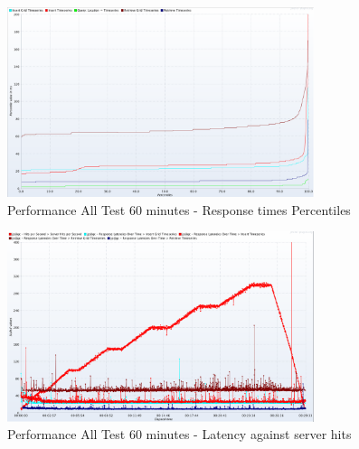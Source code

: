 \begin{figure}[htp]
    \centering
    \includegraphics[width=0.8\textwidth]{results/obs/all/obs_all_60m_response_times_percentiles.png}
    \caption{Performance All Test 60 minutes - Response times Percentiles}
    \label{fi:test_obs_all_60m_latency_percentile}
\end{figure}

\begin{figure}[htp]
    \centering
    \includegraphics[width=0.8\textwidth]{results/obs/all/obs_all_60m_res_latencies_against_hits.png}
    \caption{Performance All Test 60 minutes - Latency against server hits}
    \label{fi:test_obs_all_60m_latency}
\end{figure}


